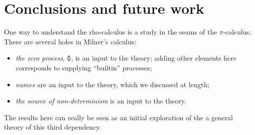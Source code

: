 \section{Conclusions and future work}

One way to understand the rho-calculus is a study in the seams of the $\pi$-calculus. There are several holes in Milner's calculus:

\begin{itemize}
  \item \emph{the zero process}, $\mathsf{0}$, is an input to the theory; adding other elements here corresponds to supplying ``builtin'' processes;
  \item \emph{names} are an input to the theory, which we discussed at length;
  \item \emph{the source of non-determinism} is an input to the theory.
\end{itemize}

The results here can really be seen as an initial exploration of the a general theory of this third dependency.




